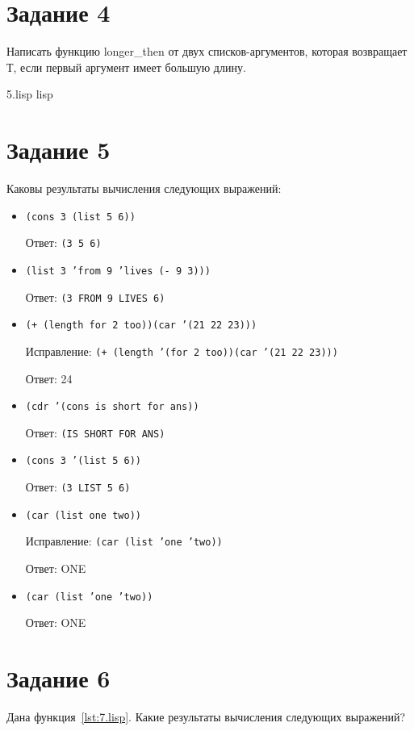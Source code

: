 \section{Задание 4}
Написать функцию longer\_then от двух списков-аргументов, которая возвращает Т, если первый аргумент имеет большую длину.

{5.lisp}
{lisp}
{}

\section{Задание 5}
Каковы результаты вычисления следующих выражений:

\begin{itemize}
	\item \texttt{(cons 3 (list 5 6))}
	
	Ответ: \texttt{(3 5 6)}
	
	\item \texttt{(list 3 'from 9 'lives (- 9 3)))}
	
	Ответ: \texttt{(3 FROM 9 LIVES 6)}
	
	\item \texttt{(+ (length for 2 too))(car '(21 22 23)))}
	
	Исправление: \texttt{(+ (length '(for 2 too))(car '(21 22 23)))}
	
	Ответ: 24
	
	\item \texttt{(cdr '(cons is short for ans))}
	
	Ответ: \texttt{(IS SHORT FOR ANS)}
	
	\item \texttt{(cons 3 '(list 5 6))}
	
	Ответ: \texttt{(3 LIST 5 6)}
	
	\item \texttt{(car (list one two))}
	
	Исправление: \texttt{(car (list 'one 'two))}
	
	Ответ: ONE
	
	\item \texttt{(car (list 'one 'two))}
	
	Ответ: ONE
\end{itemize}

\section{Задание 6}

Дана функция~\ref{lst:7.lisp}. Какие результаты вычисления следующих выражений?


